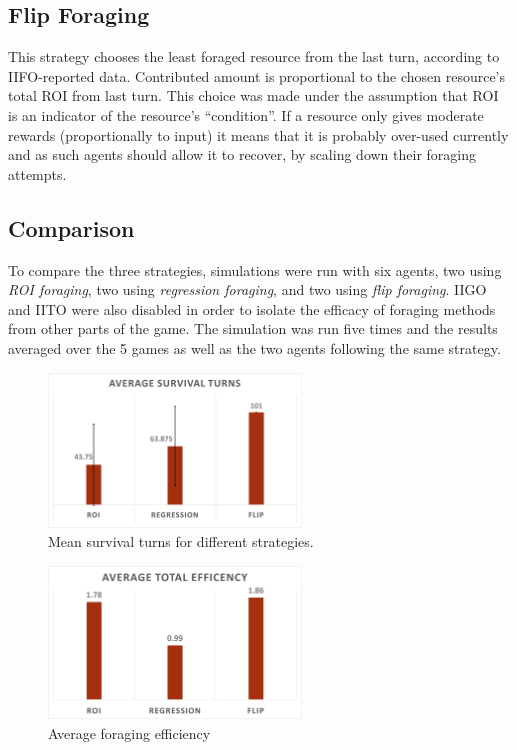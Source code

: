 \subsection{Flip Foraging}

This strategy chooses the least foraged resource from the last turn, according to IIFO-reported data. Contributed amount is proportional to the chosen resource's total ROI from last turn. This choice was made under the assumption that ROI is an indicator of the resource's ``condition''. If a resource only gives moderate rewards (proportionally to input) it means that it is probably over-used currently and as such agents should allow it to recover, by scaling down their foraging attempts.

\subsection{Comparison}

To compare the three strategies, simulations were run with six agents, two using \emph{ROI foraging}, two using \emph{regression foraging}, and two using \emph{flip foraging}. IIGO and IITO were also disabled in order to isolate the efficacy of foraging methods from other parts of the game. The simulation was run five times and the results averaged over the 5 games as well as the two agents following the same strategy.

\begin{figure}[H] 
\centering
\includegraphics[width=0.6\textwidth]{09_team1_agentdesign/images/mean_survival_turns}
\caption{Mean survival turns for different strategies.}
\label{fig:team1:mean_survival}
\end{figure} 

\begin{figure}[H] 
\centering
\includegraphics[width=0.6\textwidth]{09_team1_agentdesign/images/total_efficiency}
\caption{Average foraging efficiency}
\label{fig:team1:average_efficiency}
\end{figure} 

